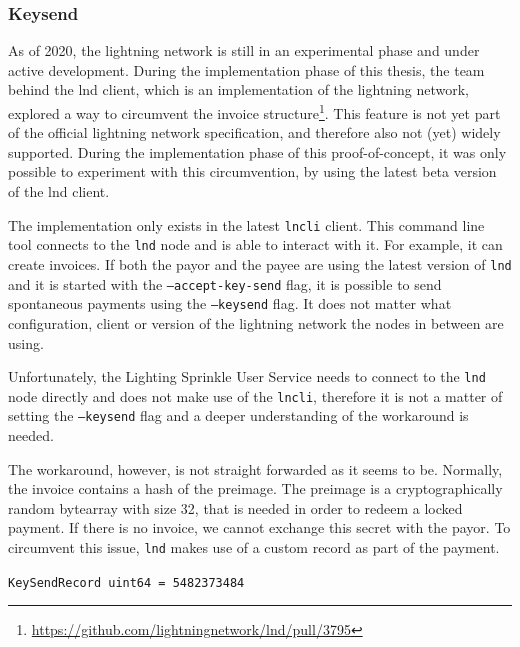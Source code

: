 \subsubsection{Keysend}
\label{sec:keysend}

As of 2020, the lightning network is still in an experimental phase and under active development. During the implementation phase of this thesis, the team behind the lnd client, which is an implementation of the lightning network, explored a way to circumvent the invoice structure\footnote{\url{https://github.com/lightningnetwork/lnd/pull/3795}}. This feature is not yet part of the official lightning network specification, and therefore also not (yet) widely supported. During the implementation phase of this proof-of-concept, it was only possible to experiment with this circumvention, by using the latest beta version of the lnd client. 

The implementation only exists in the latest \texttt{lncli} client. This command line tool connects to the \texttt{lnd} node and is able to interact with it. For example, it can create invoices. If both the payor and the payee are using the latest version of \texttt{lnd} and it is started with the \texttt{--accept-key-send} flag, it is possible to send spontaneous payments using the \texttt{--keysend} flag. It does not matter what configuration, client or version of the lightning network the nodes in between are using. 

Unfortunately, the Lighting Sprinkle User Service needs to connect to the \texttt{lnd} node directly and does not make use of the \texttt{lncli}, therefore it is not a matter of setting the \texttt{--keysend} flag and a deeper understanding of the workaround is needed.

The workaround, however, is not straight forwarded as it seems to be. Normally, the invoice contains a hash of the preimage. The preimage is a cryptographically random bytearray with size 32, that is needed in order to redeem a locked payment. If there is no invoice, we cannot exchange this secret with the payor. To circumvent this issue, \texttt{lnd} makes use of a custom record as part of the payment.

\texttt{KeySendRecord uint64 = 5482373484}

